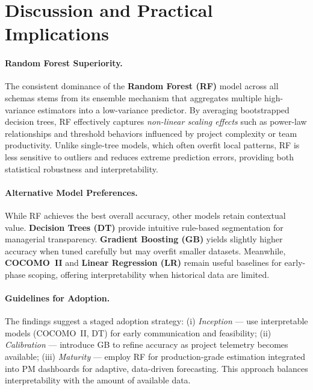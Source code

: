 \documentclass[11pt,a4paper]{article}
\begin{document}
    

\section{Discussion and Practical Implications}


\paragraph{Random Forest Superiority.}
The consistent dominance of the \textbf{Random Forest (RF)} model across all schemas 
stems from its ensemble mechanism that aggregates multiple high-variance estimators 
into a low-variance predictor.  
By averaging bootstrapped decision trees, RF effectively captures 
\textit{non-linear scaling effects} such as power-law relationships 
and threshold behaviors influenced by project complexity or team productivity.  
Unlike single-tree models, which often overfit local patterns, 
RF is less sensitive to outliers and reduces extreme prediction errors, 
providing both statistical robustness and interpretability.  

\paragraph{Alternative Model Preferences.}
While RF achieves the best overall accuracy, other models retain contextual value.  
\textbf{Decision Trees (DT)} provide intuitive rule-based segmentation 
for managerial transparency.  
\textbf{Gradient Boosting (GB)} yields slightly higher accuracy 
when tuned carefully but may overfit smaller datasets.  
Meanwhile, \textbf{COCOMO~II} and \textbf{Linear Regression (LR)} remain 
useful baselines for early-phase scoping, 
offering interpretability when historical data are limited.  

\paragraph{Guidelines for Adoption.}
The findings suggest a staged adoption strategy:  
(i) \textit{Inception} — use interpretable models (COCOMO~II, DT) 
for early communication and feasibility;  
(ii) \textit{Calibration} — introduce GB to refine accuracy 
as project telemetry becomes available;  
(iii) \textit{Maturity} — employ RF for production-grade estimation 
integrated into PM dashboards for adaptive, data-driven forecasting.  
This approach balances interpretability with the amount of available data.  
\end{document}
